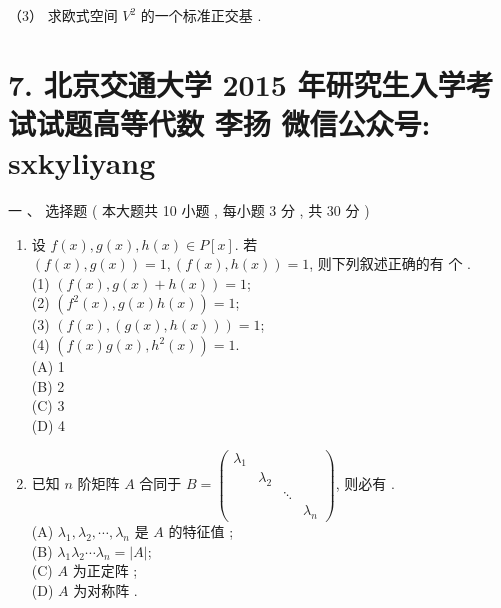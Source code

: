 \documentclass[10pt]{article}
\begin{document}
{（3） 求欧式空间  $V^{2}$  的一个标准正交基 .

\section{7. 北京交通大学 2015 年研究生入学考试试题高等代数 
 李扬 
 微信公众号: sxkyliyang}
 一 、 选择题 ( 本大题共  10  小题 ,  每小题  3  分 ,  共  30  分 )

\begin{enumerate}
  \item  设  $f(x), g(x), h(x) \in P[x]$.  若  $(f(x), g(x))=1,(f(x), h(x))=1$,  则下列叙述正确的有   个 .\\
(1) $(f(x), g(x)+h(x))=1$;\\
(2) $\left(f^{2}(x), g(x) h(x)\right)=1$;\\
(3) $(f(x),(g(x), h(x)))=1$;\\
(4) $\left(f(x) g(x), h^{2}(x)\right)=1$.\\
(A) 1\\
(B) 2\\
(C) 3\\
(D) 4

  \item  已知  $n$  阶矩阵  $A$  合同于  $B=\left(\begin{array}{cccc}\lambda_{1} & & & \\ & \lambda_{2} & & \\ & & \ddots & \\ & & & \lambda_{n}\end{array}\right)$,  则必有  .\\
(A) $\lambda_{1}, \lambda_{2}, \cdots, \lambda_{n}$  是  $A$  的特征值 ;\\
(B) $\lambda_{1} \lambda_{2} \cdots \lambda_{n}=|A|$;\\
(C) $A$  为正定阵 ;\\
(D) $A$  为对称阵 .


\end{enumerate}}
\end{document}

